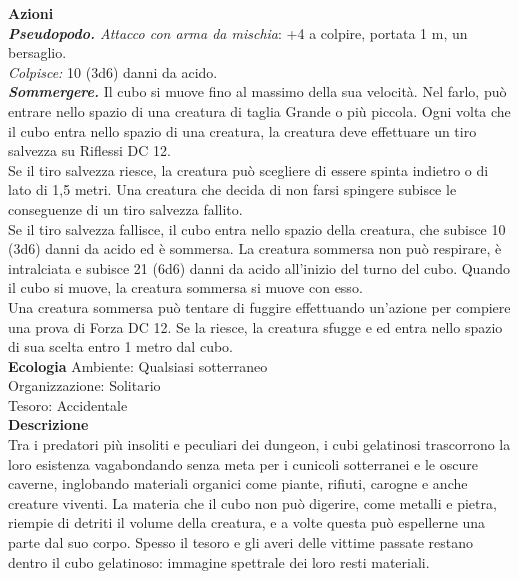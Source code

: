 \begin{multicols}{2}
\smallskip\textbf{Azioni}\\

\emph{\textbf{Pseudopodo.} Attacco con arma da mischia}: +4 a colpire, portata 1 m, un bersaglio.\\

\emph{Colpisce:} 10 (3d6) danni da acido.\\

\emph{\textbf{Sommergere.}} Il cubo si muove fino al massimo della sua velocità. Nel farlo, può entrare nello spazio di una creatura di taglia Grande o più piccola. Ogni volta che il cubo entra nello spazio di una creatura, la creatura deve effettuare un tiro salvezza su Riflessi DC 12.\\

Se il tiro salvezza riesce, la creatura può scegliere di essere spinta indietro o di lato di 1,5 metri. Una creatura che decida di non farsi spingere subisce le conseguenze di un tiro salvezza fallito.\\

Se il tiro salvezza fallisce, il cubo entra nello spazio della creatura, che subisce 10 (3d6) danni da acido ed è sommersa. La creatura sommersa non può respirare, è intralciata e subisce 21 (6d6) danni da acido all'inizio del turno del cubo. Quando il cubo si muove, la creatura sommersa si muove con esso.\\

Una creatura sommersa può tentare di fuggire effettuando un'azione per compiere una prova di Forza DC 12. Se la riesce, la creatura sfugge e ed entra nello spazio di sua scelta entro 1 metro dal cubo.\\
\textbf{Ecologia}
Ambiente: Qualsiasi sotterraneo\\
Organizzazione: Solitario\\
Tesoro: Accidentale\\
\textbf{Descrizione}\\
Tra i predatori più insoliti e peculiari dei dungeon, i cubi gelatinosi trascorrono la loro esistenza vagabondando senza meta per i cunicoli sotterranei e le oscure caverne, inglobando materiali organici come piante, rifiuti, carogne e anche creature viventi. La materia che il cubo non può digerire, come metalli e pietra, riempie di detriti il volume della creatura, e a volte questa può espellerne una parte dal suo corpo. Spesso il tesoro e gli averi delle vittime passate restano dentro il cubo gelatinoso: immagine spettrale dei loro resti materiali.\\


\end{multicols}
